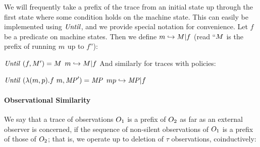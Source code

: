 \documentclass[acmsmall,review,anonymous]{acmart}\settopmatter{printfolios=true,printccs=false,printacmref=false}
\begin{document}

We will frequently take a prefix of the trace from an initial state up
through the first state where some condition holds on the machine state.
This can easily be implemented using \(\mathit{Until}\), and we provide special notation
for convenience.
%
Let \(f\) be a predicate on machine states. Then we define \(m
\hookrightarrow M | f\) (read ``\(M\) is the prefix of
running \(m\) up to \(f\)''):

            {\(\mathit{Until}~(f,M')
              = M\)}
            {\(m \hookrightarrow M | f\)}
\noindent
And similarly for traces with policies:

            {\(\mathit{Until}~(\lambda (m,p).f\ m,\mathit{MP}') = \mathit{MP}\)}
         {\(mp \hookrightarrow \mathit{MP} | f\)}


\paragraph*{Observational Similarity}

We say that a trace of observations $O_1$ is a prefix of $O_2$
as far as an external observer is concerned, if the sequence of
non-silent observations of $O_1$ is a prefix of those of
$O_2$; that is, we operate up to deletion of \(\tau\) observations,
coinductively:

\begin{minipage}{.3\textwidth}
  \judgment{}{\(\obsT \lesssim \obsT\)}
\end{minipage}
\begin{minipage}{.3\textwidth}
\judgment{}{\(\tau \lesssim \obsT\)}
\end{minipage}
\begin{minipage}{.3\textwidth}
\end{minipage}
\end{document}
